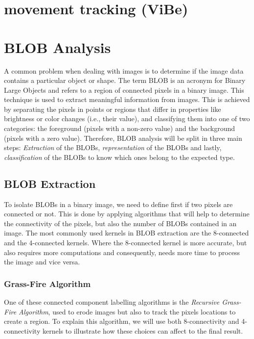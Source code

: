 \section{movement tracking (ViBe)}



\section{BLOB Analysis}
A common problem when dealing with images is to determine if the image data contains a particular object or shape. The term BLOB is an acronym for Binary Large Objects and refers to a region of connected pixels in a binary image. This technique is used to extract meaningful information from images. This is achieved by separating the pixels in points or regions that differ in properties like brightness or color changes (i.e., their value), and classifying them into one of two categories: the foreground (pixels with a non-zero value) and the background (pixels with a zero value).
Therefore, BLOB analysis will be split in three main steps: \textit{Extraction} of the BLOBs, \textit{representation} of the BLOBs and lastly, \textit{classification} of the BLOBs to know which ones belong to the expected type.
\subsection{BLOB Extraction}
To isolate BLOBs in a binary image, we need to define first if two pixels are connected or not. This is done by applying algorithms that will help to determine the connectivity of the pixels, but also the number of BLOBs contained in an image. The most commonly used kernels in BLOB extraction are the 8-connected and the 4-connected kernels. Where the 8-connected kernel is more accurate, but also requires more computations and consequently, needs more time to process the image and vice versa.


\subsubsection{Grass-Fire Algorithm}
One of these connected component labelling algorithms is the \textit{Recursive Grass-Fire Algorithm}, used to erode images but also to track the pixels locations to create a region.
To explain this algorithm, we will use both 8-connectivity and 4-connectivity kernels to illustrate how these choices can affect to the final result.

